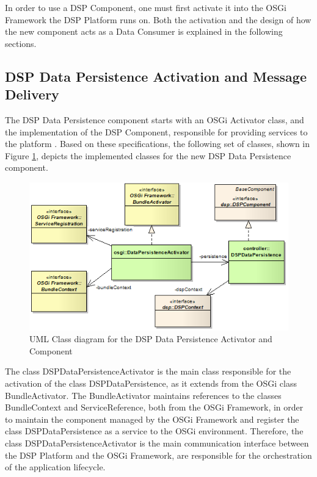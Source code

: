 In order to use a DSP Component, one must first activate it into the OSGi
Framework the DSP Platform runs on. Both the activation and the design of how
the new component acts as a Data Consumer is explained in the following
sections.

\subsection{DSP Data Persistence Activation and Message Delivery}

The DSP Data Persistence component starts with an OSGi Activator class, and 
the implementation of the DSP Component, responsible for providing services 
to the platform \cite{netbeams-dsp-architecture}. Based on these 
specifications, the following set of classes, shown in Figure 
\ref{fig:DSP-DataPersistence-Activator-Class-Diagram}, depicts the implemented
classes for the new DSP Data Persistence component.

\begin{figure}[!h]
  \centering
  \includegraphics[scale=0.65]{../diagrams/DSP-DataPersistence-Activator-Class-Diagram}
  \caption{UML Class diagram for the DSP Data Persistence Activator and Component}
  \label{fig:DSP-DataPersistence-Activator-Class-Diagram}
\end{figure}

The class DSPDataPersistenceActivator is the main class responsible for the
activation of the class DSPDataPersistence, as it extends from the OSGi
class BundleActivator. The BundleActivator maintains references to the classes
BundleContext and ServiceReference, both from the OSGi Framework, in order to
maintain the component managed by the OSGi Framework and register the class
DSPDataPersistence as a service to the OSGi environment. Therefore, the class
DSPDataPersistenceActivator is the main communication interface between the 
DSP Platform and the OSGi Framework, are responsible for the orchestration of
the application lifecycle.

